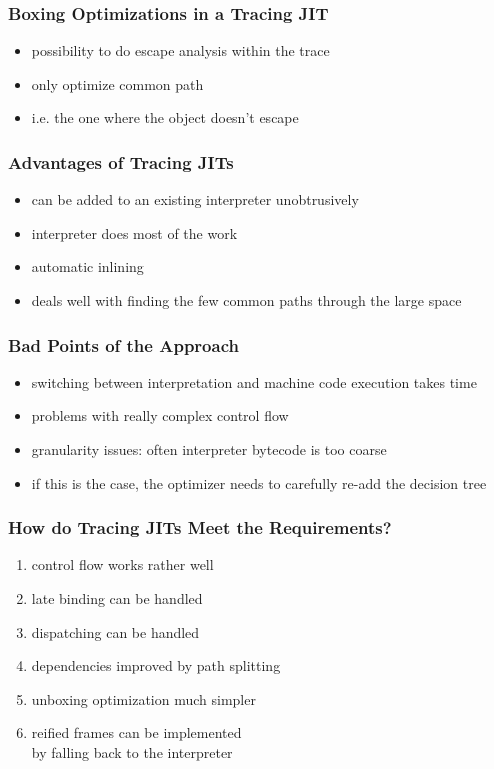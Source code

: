 \documentclass[utf8x]{beamer}
\begin{document}
\begin{frame}
  \frametitle{Boxing Optimizations in a Tracing JIT}
  \begin{itemize}
      \item possibility to do escape analysis within the trace
      \item only optimize common path
      \item i.e. the one where the object doesn't escape
  \end{itemize}
\end{frame}


\begin{frame}
    \frametitle{Advantages of Tracing JITs}
    \begin{itemize}
    \item can be added to an existing interpreter unobtrusively
    \item interpreter does most of the work
    \item automatic inlining
    \item deals well with finding the few common paths through the large space
    \end{itemize}
\end{frame}

\begin{frame}
    \frametitle{Bad Points of the Approach}
    \begin{itemize}
        \item switching between interpretation and machine code execution takes time
        \item problems with really complex control flow
        \item granularity issues: often interpreter bytecode is too coarse
        \item if this is the case, the optimizer needs to carefully re-add the decision tree
    \end{itemize}
\end{frame}

\begin{frame}
  \frametitle{How do Tracing JITs Meet the Requirements?}
  \begin{enumerate}
      \item control flow works rather well
      \item late binding can be handled
      \item dispatching can be handled
      \item dependencies improved by path splitting
      \item unboxing optimization much simpler
      \item reified frames can be implemented \\
      by falling back to the interpreter
  \end{enumerate}
\end{frame}
\end{document}
